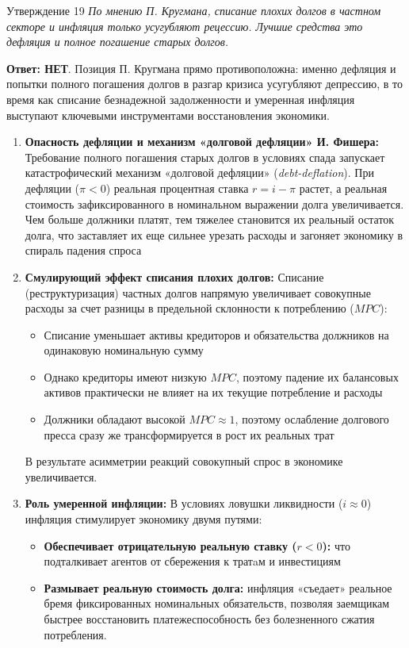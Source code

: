 \documentclass[10pt,a4paper]{article}
\newcommand{\qnet}{\textbf{\color{nored}Ответ: НЕТ}}
\newenvironment{answer}[2]{%
  \begin{qbox}{Утверждение #1}
  \textit{#2}\par\smallskip
}{%
  \end{qbox}\vspace{2pt}
}
\begin{document}
\begin{answer}{19}{По мнению П. Кругмана, списание плохих долгов в частном секторе и инфляция только усугубляют рецессию. Лучшие средства это дефляция и полное погашение старых долгов.}
\qnet. Позиция П. Кругмана прямо противоположна: именно дефляция и попытки полного погашения долгов в разгар кризиса усугубляют депрессию, в то время как списание безнадежной задолженности и умеренная инфляция выступают ключевыми инструментами восстановления экономики.

\begin{enumerate}
    \item \textbf{Опасность дефляции и механизм «долговой дефляции» И. Фишера:}
    Требование полного погашения старых долгов в условиях спада запускает катастрофический механизм «долговой дефляции» (\textit{debt-deflation}). При дефляции ($\pi < 0$) реальная процентная ставка $r = i - \pi$ растет, а реальная стоимость зафиксированного в номинальном выражении долга увеличивается. Чем больше должники платят, тем тяжелее становится их реальный остаток долга, что заставляет их еще сильнее урезать расходы и загоняет экономику в спираль падения спроса

    \item \textbf{Смулирующий эффект списания плохих долгов:}
    Списание (реструктуризация) частных долгов напрямую увеличивает совокупные расходы за счет разницы в предельной склонности к потреблению ($MPC$):
    \begin{itemize}
        \item Списание уменьшает активы кредиторов и обязательства должников на одинаковую номинальную сумму
        \item Однако кредиторы имеют низкую $MPC$, поэтому падение их балансовых активов практически не влияет на их текущие потребление и расходы
        \item Должники обладают высокой $MPC \approx 1$, поэтому ослабление долгового пресса сразу же трансформируется в рост их реальных трат
    \end{itemize}
    В результате асимметрии реакций совокупный спрос в экономике увеличивается.

    \item \textbf{Роль умеренной инфляции:}
    В условиях ловушки ликвидности ($i \approx 0$) инфляция стимулирует экономику двумя путями:
    \begin{itemize}
        \item \textbf{Обеспечивает отрицательную реальную ставку ($r < 0$):} что подталкивает агентов от сбережения к тратaм и инвестициям
        \item \textbf{Размывает реальную стоимость долга:} инфляция «съедает» реальное бремя фиксированных номинальных обязательств, позволяя заемщикам быстрее восстановить платежеспособность без болезненного сжатия потребления.
    \end{itemize}
\end{enumerate}
\end{answer}
\end{document}
